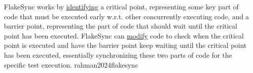 \documentclass{article}
\begin{document}
  {FlakeSync works by \ul{identifying} a critical point, representing some key part of code that must be executed early w.r.t. other concurrently executing code, and a barrier point, representing the part of code that should wait until the critical point has been executed. FlakeSync can \ul{modify} code to check when the critical point is executed and have the barrier point keep waiting until the critical point has been executed, essentially synchronizing these two parts of code for the specific test execution.}
  {rahman2024flakesync}
\end{document}
